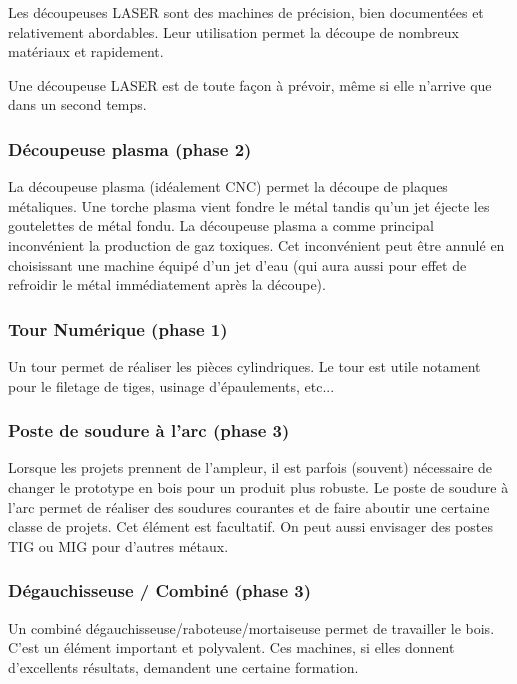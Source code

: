Les découpeuses LASER sont des machines de précision, bien documentées et relativement abordables. Leur utilisation
permet la découpe de nombreux matériaux et rapidement.

Une découpeuse LASER est de toute façon à prévoir, même si elle n'arrive que dans un second temps.

\subsubsection{Découpeuse plasma (phase 2)}

La découpeuse plasma (idéalement CNC) permet la découpe de plaques métaliques. Une torche plasma vient fondre le métal
tandis qu'un jet éjecte les goutelettes de métal fondu. La découpeuse plasma a comme principal inconvénient la
production de gaz toxiques. Cet inconvénient peut être annulé en choisissant une machine équipé d'un jet d'eau (qui aura
aussi pour effet de refroidir le métal immédiatement après la découpe).

\subsubsection{Tour Numérique (phase 1)}

Un tour permet de réaliser les pièces cylindriques. Le tour est utile notament pour le filetage de tiges, usinage
d'épaulements, etc...

\subsubsection{Poste de soudure à l'arc (phase 3)}

Lorsque les projets prennent de l'ampleur, il est parfois (souvent) nécessaire de changer le prototype en bois pour un
produit plus robuste. Le poste de soudure à l'arc permet de réaliser des soudures courantes et de faire aboutir une
certaine classe de projets. Cet élément est facultatif. On peut aussi envisager des postes TIG ou MIG pour d'autres
métaux.

\subsubsection{Dégauchisseuse / Combiné (phase 3)}

Un combiné dégauchisseuse/raboteuse/mortaiseuse permet de travailler le bois. C'est un élément important et polyvalent.
Ces machines, si elles donnent d'excellents résultats, demandent une certaine formation.

